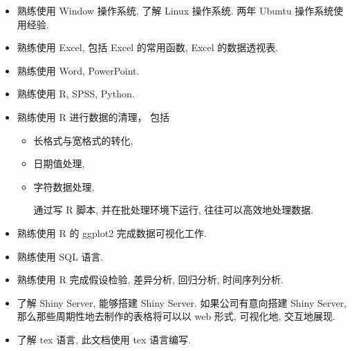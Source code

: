 \begin{itemize}
\item 熟练使用 Window 操作系统, 了解 Linux 操作系统. 两年 Ubuntu 操作系统使用经验.
\item 熟练使用 Excel, 包括 Excel 的常用函数, Excel 的数据透视表.
\item 熟练使用 Word, PowerPoint.
\item 熟练使用 R, SPSS, Python.
\item 熟练使用 R 进行数据的清理， 包括
\begin{itemize}
\item 长格式与宽格式的转化,
\item 日期值处理,
\item 字符数据处理,


通过写 R 脚本, 并在批处理环境下运行, 往往可以高效地处理数据.
\end{itemize}
\item 熟练使用 R 的 ggplot2 完成数据可视化工作.
\item 熟练使用 SQL 语言.
\item 熟练使用 R 完成假设检验, 差异分析, 回归分析, 时间序列分析.
\item 了解 Shiny Server, 能够搭建 Shiny Server. 如果公司有意向搭建 Shiny Server, 那么那些周期性地去制作的表格将可以以 web 形式, 可视化地, 交互地展现.
\item 了解 tex 语言, 此文档使用 tex 语言编写.
\end{itemize}
